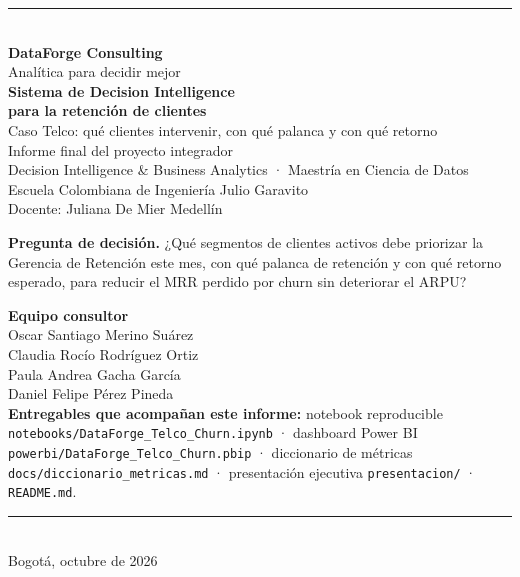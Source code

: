 \documentclass[10.5pt,a4paper]{article}
\begin{document}
\begin{titlepage}
\thispagestyle{empty}
\vspace*{0.4cm}
{\color{azul}\rule{\textwidth}{1.2pt}}\\[4pt]
{\large\bfseries\color{azul} DataForge Consulting}\\[-2pt]
{\small\color{gris} Analítica para decidir mejor}\\[2.2cm]

{\Huge\bfseries Sistema de Decision Intelligence\\[4pt] para la retención de clientes}\\[10pt]
{\Large Caso Telco: qué clientes intervenir, con qué palanca y con qué retorno}\\[1.2cm]

{\large Informe final del proyecto integrador}\\[4pt]
Decision Intelligence \& Business Analytics · Maestría en Ciencia de Datos\\
Escuela Colombiana de Ingeniería Julio Garavito\\
Docente: Juliana De Mier Medellín\\[1.4cm]

\begin{caja}
\textbf{Pregunta de decisión.} ¿Qué segmentos de clientes activos debe priorizar la Gerencia de Retención este mes, con qué palanca de retención y con qué retorno esperado, para reducir el MRR perdido por churn sin deteriorar el ARPU?
\end{caja}
\vspace{1.0cm}

\textbf{Equipo consultor}\\[2pt]
Oscar Santiago Merino Suárez\\
Claudia Rocío Rodríguez Ortiz\\
Paula Andrea Gacha García\\
Daniel Felipe Pérez Pineda\\[1.2cm]

{\small\color{gris}
\textbf{Entregables que acompañan este informe:} notebook reproducible \texttt{notebooks/DataForge\_Telco\_Churn.ipynb} · dashboard Power BI \texttt{powerbi/DataForge\_Telco\_Churn.pbip} · diccionario de métricas \texttt{docs/diccionario\_metricas.md} · presentación ejecutiva \texttt{presentacion/} · \texttt{README.md}.}

\vfill
{\color{azul}\rule{\textwidth}{0.6pt}}\\
Bogotá, octubre de 2026
\end{titlepage}
\end{document}
